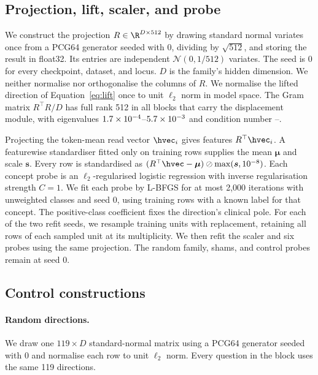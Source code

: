 \subsection{Projection, lift, scaler, and probe}
\label{app:repro-probe}

We construct the projection $R\in\R^{D\times512}$ by drawing standard normal variates once from a PCG64 generator seeded with $0$, dividing by $\sqrt{512}$, and storing the result in float32. Its entries are independent $\mathcal{N}(0,1/512)$ variates. The seed is $0$ for every checkpoint, dataset, and locus. $D$ is the family's hidden dimension. We neither normalise nor orthogonalise the columns of $R$. We normalise the lifted direction of Equation~\ref{eq:lift} once to unit $\ell_2$ norm in model space. The Gram matrix $R^{\top}R/D$ has full rank 512 in all \cfAltdirdBlocks{} blocks that carry the displacement module, with eigenvalues $1.7\times10^{-4}$--$5.7\times10^{-3}$ and condition number \cfAltdirdCondMin{}--\cfAltdirdCondMax{}.

Projecting the token-mean read vector $\hvec_i$ gives features $R^{\top}\hvec_i$. A featurewise standardiser fitted only on training rows supplies the mean $\boldsymbol\mu$ and scale $\boldsymbol s$. Every row is standardised as $(R^{\top}\hvec-\boldsymbol\mu)\oslash\max(\boldsymbol s,10^{-8})$. Each concept probe is an $\ell_2$-regularised logistic regression with inverse regularisation strength $C=1$. We fit each probe by L-BFGS for at most 2{,}000 iterations with unweighted classes and seed $0$, using training rows with a known label for that concept. The positive-class coefficient fixes the direction's clinical pole. For each of the two refit seeds, we resample training units with replacement, retaining all rows of each sampled unit at its multiplicity. We then refit the scaler and six probes using the same projection. The random family, shams, and control probes remain at seed 0.

\subsection{Control constructions}
\label{app:repro-controls}

\paragraph{Random directions.} We draw one $119\times D$ standard-normal matrix using a PCG64 generator seeded with $0$ and normalise each row to unit $\ell_2$ norm. Every question in the block uses the same 119 directions.

